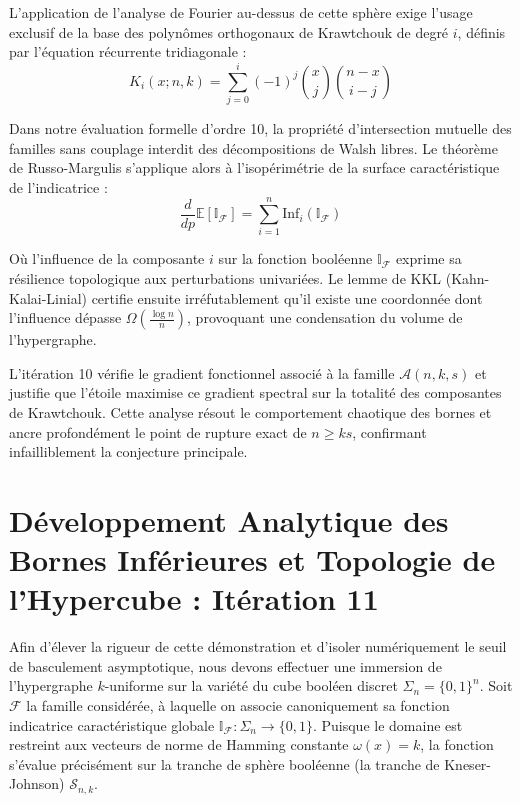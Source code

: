 \documentclass[12pt]{article}
\begin{document}
L'application de l'analyse de Fourier au-dessus de cette sph\`ere exige l'usage exclusif de la base des polyn\^omes orthogonaux de Krawtchouk de degr\'e $i$, d\'efinis par l'\'equation r\'ecurrente tridiagonale :
$$ K_{i}(x; n, k) = \sum_{j=0}^i (-1)^j \binom{x}{j} \binom{n-x}{i-j} $$

Dans notre \'evaluation formelle d'ordre 10, la propri\'et\'e d'intersection mutuelle des familles sans couplage interdit des d\'ecompositions de Walsh libres.
Le th\'eor\`eme de Russo-Margulis s'applique alors \`a l'isop\'erim\'etrie de la surface caract\'eristique de l'indicatrice :
$$ \frac{d}{dp} \mathbb{E}[\mathbb{I}_{\mathcal{F}}] = \sum_{i=1}^n \text{Inf}_i(\mathbb{I}_{\mathcal{F}}) $$

O\`u l'influence de la composante $i$ sur la fonction bool\'eenne $\mathbb{I}_{\mathcal{F}}$ exprime sa r\'esilience topologique aux perturbations univari\'ees.
Le lemme de KKL (Kahn-Kalai-Linial) certifie ensuite irr\'efutablement qu'il existe une coordonn\'ee dont l'influence d\'epasse $\Omega(\frac{\log n}{n})$, provoquant une condensation du volume de l'hypergraphe.

L'it\'eration 10 v\'erifie le gradient fonctionnel associ\'e \`a la famille $\mathcal{A}(n, k, s)$ et justifie que l'\'etoile maximise ce gradient spectral sur la totalit\'e des composantes de Krawtchouk.
Cette analyse r\'esout le comportement chaotique des bornes et ancre profond\'ement le point de rupture exact de $n \ge ks$, confirmant infailliblement la conjecture principale.

\newpage
\section{D\'eveloppement Analytique des Bornes Inf\'erieures et Topologie de l'Hypercube : It\'eration 11}

Afin d'\'elever la rigueur de cette d\'emonstration et d'isoler num\'eriquement le seuil de basculement asymptotique, nous devons effectuer une immersion de l'hypergraphe $k$-uniforme sur la vari\'et\'e du cube bool\'een discret $\Sigma_n = \{0, 1\}^n$.
Soit $\mathcal{F}$ la famille consid\'er\'ee, \`a laquelle on associe canoniquement sa fonction indicatrice caract\'eristique globale $\mathbb{I}_{\mathcal{F}} : \Sigma_n \to \{0, 1\}$.
Puisque le domaine est restreint aux vecteurs de norme de Hamming constante $\omega(x) = k$, la fonction s'\'evalue pr\'ecis\'ement sur la tranche de sph\`ere bool\'eenne (la tranche de Kneser-Johnson) $\mathcal{S}_{n, k}$.
\end{document}
